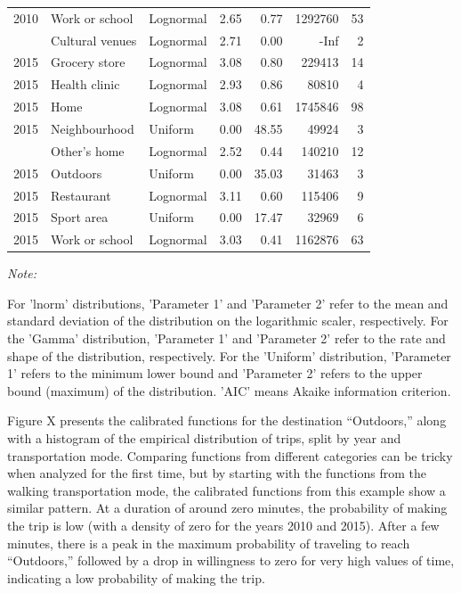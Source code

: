 \documentclass[preprint, 3p,
authoryear]{elsarticle} %
\begin{document}
\begin{table}
{\begin{threeparttable}
\begin{tabular}[t]{rllrrrr}
2010 & Work or school & Lognormal & 2.65 & 0.77 & 1292760 & 53\\
\addlinespace
2015 & Cultural venues & Lognormal & 2.71 & 0.00 & -Inf & 2\\
2015 & Grocery store & Lognormal & 3.08 & 0.80 & 229413 & 14\\
2015 & Health clinic & Lognormal & 2.93 & 0.86 & 80810 & 4\\
2015 & Home & Lognormal & 3.08 & 0.61 & 1745846 & 98\\
2015 & Neighbourhood & Uniform & 0.00 & 48.55 & 49924 & 3\\
\addlinespace
2015 & Other's home & Lognormal & 2.52 & 0.44 & 140210 & 12\\
2015 & Outdoors & Uniform & 0.00 & 35.03 & 31463 & 3\\
2015 & Restaurant & Lognormal & 3.11 & 0.60 & 115406 & 9\\
2015 & Sport area & Uniform & 0.00 & 17.47 & 32969 & 6\\
2015 & Work or school & Lognormal & 3.03 & 0.41 & 1162876 & 63\\
\bottomrule
\end{tabular}
\begin{tablenotes}
\item \textit{Note: } 
\item For 'lnorm' distributions, 'Parameter 1' and 'Parameter 2' refer to the mean and standard deviation of the distribution on the logarithmic scaler, respectively. For the 'Gamma' distribution, 'Parameter 1' and 'Parameter 2' refer to the rate and shape of the distribution, respectively. For the 'Uniform' distribution,  'Parameter 1' refers to the minimum lower bound and 'Parameter 2'  refers to the upper bound (maximum) of the distribution.  'AIC' means Akaike information criterion.
\end{tablenotes}
\end{threeparttable}}
\end{table}

Figure X presents the calibrated functions for the destination
``Outdoors,'' along with a histogram of the empirical distribution of
trips, split by year and transportation mode. Comparing functions from
different categories can be tricky when analyzed for the first time, but
by starting with the functions from the walking transportation mode, the
calibrated functions from this example show a similar pattern. At a
duration of around zero minutes, the probability of making the trip is
low (with a density of zero for the years 2010 and 2015). After a few
minutes, there is a peak in the maximum probability of traveling to
reach ``Outdoors,'' followed by a drop in willingness to zero for very
high values of time, indicating a low probability of making the trip.
\end{document}
